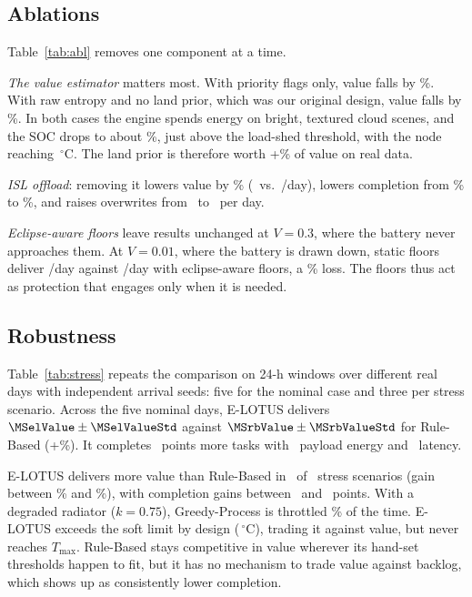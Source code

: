 \subsection{Ablations}
Table~\ref{tab:abl} removes one component at a time.

\emph{The value estimator} matters most. With priority flags only, value falls by \NoEntdrop\%. With raw entropy and no land prior, which was our original design, value falls by \Rawdrop\%. In both cases the engine spends energy on bright, textured cloud scenes, and the SOC drops to about \Rawsocmin\%, just above the load-shed threshold, with the node reaching \Rawtmax\,$^\circ$C. The land prior is therefore worth +\RawGainEL\% of value on real data.

\emph{ISL offload}: removing it lowers value by \NoISLdrop\% (\NoISLvalue\ vs.\ \ELvalueDay/day), lowers completion from \ELcompl\% to \NoISLcompl\%, and raises overwrites from \ELovf\ to \NoISLovf\ per day.

\emph{Eclipse-aware floors} leave results unchanged at $V=0.3$, where the battery never approaches them. At $V=0.01$, where the battery is drawn down, static floors deliver \StaticLowVvalue/day against \LowVvalue/day with eclipse-aware floors, a \StaticLowVdrop\% loss. The floors thus act as protection that engages only when it is needed.



\subsection{Robustness}\label{sec:stress}
Table~\ref{tab:stress} repeats the comparison on 24-h windows over different real days with independent arrival seeds: five for the nominal case and three per stress scenario. Across the five nominal days, E-LOTUS delivers $\MSelValue\pm\MSelValueStd$ against $\MSrbValue\pm\MSrbValueStd$ for Rule-Based (+\MSgain\%). It completes \MScomplDelta~points more tasks with \MSenergyWord\ payload energy and \MSlatWord\ latency.

E-LOTUS delivers more value than Rule-Based in \StressWins\ of \StressN\ stress scenarios (gain between \StressGainMin\% and \StressGainMax\%), with completion gains between \StressComplMin\ and \StressComplMax\ points. With a degraded radiator ($k=0.75$), Greedy-Process is throttled \RadGPthr\% of the time. E-LOTUS exceeds the soft limit by design (\RadELtmax\,$^\circ$C), trading it against value, but never reaches $T_{\max}$. Rule-Based stays competitive in value wherever its hand-set thresholds happen to fit, but it has no mechanism to trade value against backlog, which shows up as consistently lower completion.

